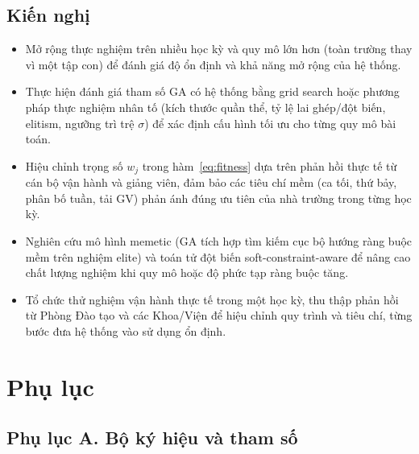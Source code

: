 \documentclass[a4paper,12pt,oneside]{article}
\renewcommand{\refname}{Tài liệu tham khảo}
\begin{document}
\subsection*{Kiến nghị}
	\begin{itemize}
		\item Mở rộng thực nghiệm trên nhiều học kỳ và quy mô lớn hơn (toàn trường thay vì một tập con) để đánh giá độ ổn định và khả năng mở rộng của hệ thống.
		\item Thực hiện đánh giá tham số GA có hệ thống bằng grid search hoặc phương pháp thực nghiệm nhân tố (kích thước quần thể, tỷ lệ lai ghép/đột biến, elitism, ngưỡng trì trệ $\sigma$) để xác định cấu hình tối ưu cho từng quy mô bài toán.
		\item Hiệu chỉnh trọng số $w_j$ trong hàm~\eqref{eq:fitness} dựa trên phản hồi thực tế từ cán bộ vận hành và giảng viên, đảm bảo các tiêu chí mềm (ca tối, thứ bảy, phân bố tuần, tải GV) phản ánh đúng ưu tiên của nhà trường trong từng học kỳ.
		\item Nghiên cứu mô hình memetic (GA tích hợp tìm kiếm cục bộ hướng ràng buộc mềm trên nghiệm elite) và toán tử đột biến soft-constraint-aware để nâng cao chất lượng nghiệm khi quy mô hoặc độ phức tạp ràng buộc tăng.
		\item Tổ chức thử nghiệm vận hành thực tế trong một học kỳ, thu thập phản hồi từ Phòng Đào tạo và các Khoa/Viện để hiệu chỉnh quy trình và tiêu chí, từng bước đưa hệ thống vào sử dụng ổn định.
	\end{itemize}
	
	\renewcommand{\refname}{Tài liệu tham khảo}
	
	
	
	\section*{Phụ lục}
	
	\subsection*{Phụ lục A. Bộ ký hiệu và tham số}
	
\end{document}
